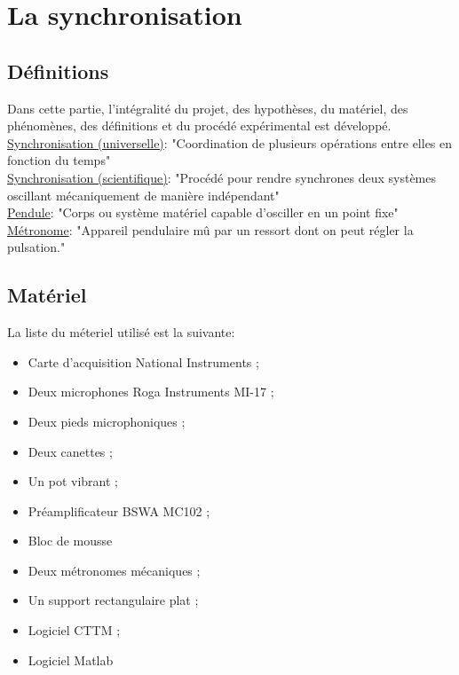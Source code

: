 \documentclass[a4paper,11pt]{report}
\begin{document}
\newpage
\null
\thispagestyle{empty}
\chapter{La synchronisation}
\section{Définitions}
Dans cette partie, l'intégralité du projet, des hypothèses, du matériel, des phénomènes, des définitions et du procédé expérimental est développé.\\
\underline{Synchronisation (universelle)}: "Coordination de plusieurs opérations entre elles en fonction du temps"\cite{wiki}\\
\underline{Synchronisation (scientifique)}: "Procédé pour rendre synchrones deux systèmes oscillant mécaniquement de manière indépendant"\cite{cntrl}\\
\underline{Pendule}: "Corps ou système matériel capable d'osciller en un point fixe"\cite{ikonet}\\
\underline{Métronome}: "Appareil pendulaire mû par un ressort dont on peut régler la pulsation."\cite{pend} \\

\section{Matériel}

La liste du méteriel utilisé est la suivante:
\begin{itemize}
\item Carte d'acquisition National Instruments ;
\item Deux microphones Roga Instruments MI-17 ;
\item Deux pieds microphoniques ;
\item Deux canettes ;
\item Un pot vibrant ;
\item Préamplificateur BSWA MC102 ;
\item Bloc de mousse
\item Deux métronomes mécaniques ;
\item Un support rectangulaire plat ;
\item Logiciel CTTM ;
\item Logiciel Matlab
\end{itemize}
\end{document}
